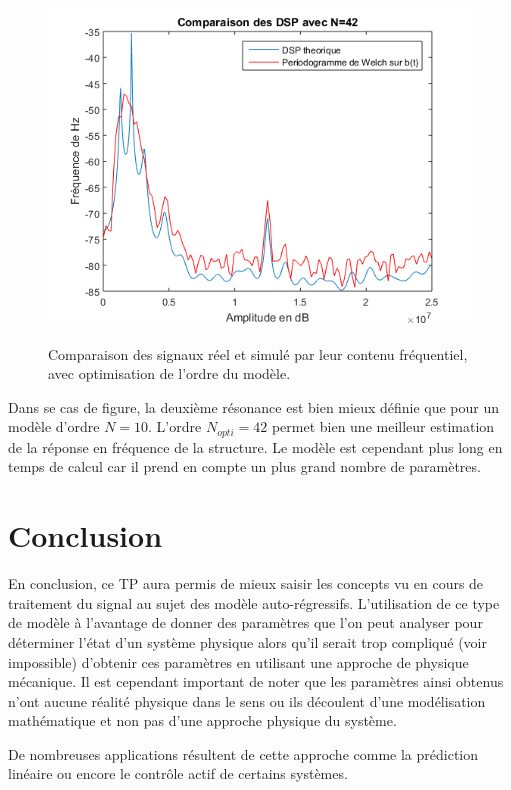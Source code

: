 \documentclass[a4paper]{article}
\begin{document}
\begin{figure}[!h]
	\centering
	\includegraphics[scale=0.5]{otpi.png}
    \label{opti}
    \caption{Comparaison des signaux réel et simulé par leur contenu fréquentiel, avec optimisation de l'ordre du modèle.}
\end{figure}

Dans se cas de figure, la deuxième résonance est bien mieux définie que pour un modèle d'ordre $N=10$. L'ordre $N_{opti} = 42$ permet bien une meilleur estimation de la réponse en fréquence de la structure. Le modèle est cependant plus long en temps de calcul car il prend en compte un plus grand nombre de paramètres.

\section{Conclusion}
En conclusion, ce TP aura permis de mieux saisir les concepts vu en cours de traitement du signal au sujet des modèle auto-régressifs. L'utilisation de ce type de modèle à l'avantage de donner des paramètres que l'on peut analyser pour déterminer l'état d'un système physique alors qu'il serait trop compliqué (voir impossible) d'obtenir ces paramètres en utilisant une approche de physique mécanique. Il est cependant important de noter que les paramètres ainsi obtenus n'ont aucune réalité physique dans le sens ou ils découlent d'une modélisation mathématique et non pas d'une approche physique du système.

De nombreuses applications résultent de cette approche comme la prédiction linéaire ou encore le contrôle actif de certains systèmes.
\end{document}
